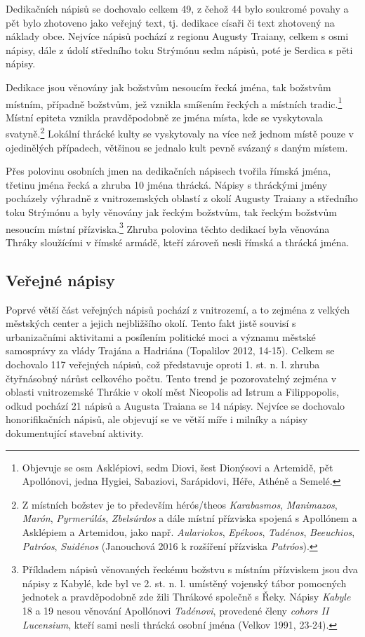 Dedikačních nápisů se dochovalo celkem 49, z čehož 44 bylo soukromé povahy a pět bylo zhotoveno jako veřejný text, tj. dedikace císaři či text zhotovený na náklady obce. Nejvíce nápisů pochází z regionu Augusty Traiany, celkem s osmi nápisy, dále z údolí středního toku Strýmónu sedm nápisů, poté je Serdica s pěti nápisy.

Dedikace jsou věnovány jak božstvům nesoucím řecká jména, tak božstvům místním, případně božstvům, jež vznikla smíšením řeckých a místních tradic.\footnote{Objevuje se osm Asklépiovi, sedm Diovi, šest Dionýsovi a Artemidě, pět Apollónovi, jedna Hygiei, Sabaziovi, Sarápidovi, Héře, Athéně a Semelé.} Místní epiteta vznikla pravděpodobně ze jména místa, kde se vyskytovala svatyně.\footnote{Z místních božstev je to především hérós/theos {\em Karabasmos}, {\em Manimazos}, {\em Marón}, {\em Pyrmerúlás}, {\em Zbelsúrdos} a dále místní přízviska spojená s Apollónem a Asklépiem a Artemidou, jako např. {\em Aulariokos}, {\em Epékoos}, {\em Tadénos}, {\em Beeuchios}, {\em Patróos}, {\em Suidénos} (Janouchová 2016 k rozšíření přízviska {\em Patróos}).} Lokální thrácké kulty se vyskytovaly na více než jednom místě pouze v ojedinělých případech, většinou se jednalo kult pevně svázaný s daným místem.

Přes polovinu osobních jmen na dedikačních nápisech tvořila římská jména, třetinu jména řecká a zhruba 10  jména thrácká. Nápisy s thráckými jmény pocházely výhradně z vnitrozemských oblastí z okolí Augusty Traiany a středního toku Strýmónu a byly věnovány jak řeckým božstvům, tak řeckým božstvům nesoucím místní přízviska.\footnote{Příkladem nápisů věnovaných řeckému božstvu s místním přízviskem jsou dva nápisy z Kabylé, kde byl ve 2. st. n. l. umístěný vojenský tábor pomocných jednotek a pravděpodobně zde žili Thrákové společně s Řeky. Nápisy {\em Kabyle} 18 a 19 nesou věnování Apollónovi {\em Tadénovi}, provedené členy {\em cohors II Lucensium}, kteří sami nesli thrácká osobní jména (Velkov 1991, 23-24).} Zhruba polovina těchto dedikací byla věnována Thráky sloužícími v římské armádě, kteří zároveň nesli římská a thrácká jména.

\subsection[veřejné-nápisy-13]{Veřejné nápisy}

Poprvé větší část veřejných nápisů pochází z vnitrozemí, a to zejména z velkých městských center a jejich nejbližšího okolí. Tento fakt jistě souvisí s urbanizačními aktivitami a posílením politické moci a významu městské samosprávy za vlády Trajána a Hadriána (Topalilov 2012, 14-15). Celkem se dochovalo 117 veřejných nápisů, což představuje oproti 1. st. n. l. zhruba čtyřnásobný nárůst celkového počtu. Tento trend je pozorovatelný zejména v oblasti vnitrozemské Thrákie v okolí měst Nicopolis ad Istrum a Filippopolis, odkud pochází 21 nápisů a Augusta Traiana se 14 nápisy. Nejvíce se dochovalo honorifikačních nápisů, ale objevují se ve větší míře i milníky a nápisy dokumentující stavební aktivity.

